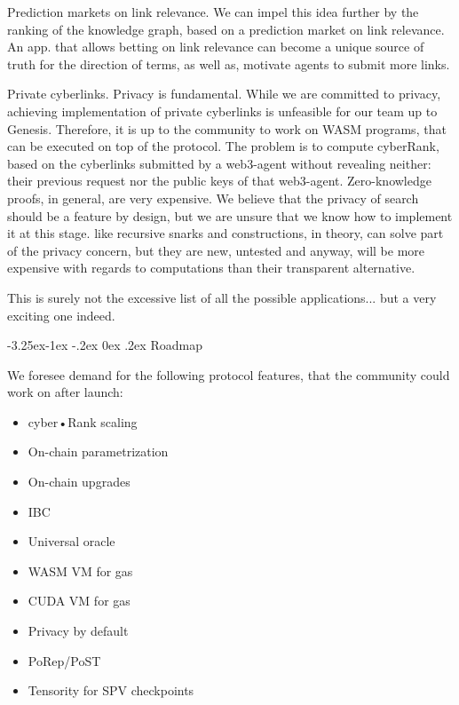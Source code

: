 \documentclass[8pt,oneside]{amsart}
\makeatletter
\newcommand{\linkgreen}[2]{\href{#1}{\color{green}{#2}}}
\renewcommand\subsection{\@startsection{subsection}{2}{\z@}%
                                     {-3.25ex\@plus -1ex \@minus -.2ex}%
                                     {0ex \@plus .2ex}%
                                     {\play\Large}}%
\newcommand{\titleSection}[1]{\subsection{#1}}
\newcommand{\code}[1]{{\PlayBold #1}}
\makeatother
\begin{document}
\begin{Abstract}
\code{Prediction markets on link relevance}. We can impel this idea further by the ranking of the knowledge graph, based on a prediction market on link relevance. An app. that allows betting on link relevance can become a unique source of truth for the direction of terms, as well as, motivate agents to submit more links.

\code{Private cyberlinks}. Privacy is fundamental. While we are committed to privacy, achieving implementation of private cyberlinks is unfeasible for our team up to Genesis. Therefore, it is up to the community to work on WASM programs, that can be executed on top of the protocol. The problem is to compute cyberRank, based on the cyberlinks submitted by a web3-agent without revealing neither: their previous request nor the public keys of that web3-agent. Zero-knowledge proofs, in general, are very expensive. We believe that the privacy of search should be a feature by design, but we are unsure that we know how to implement it at this stage. \linkgreen{https://ipfs.io/ipfs/Qmdje3AmtsfjX9edWAxo3LFhV9CTAXoUvwGR7wHJXnc2Gk}{Coda} like recursive snarks and \linkgreen{https://ipfs.io/ipfs/Qmd99xmraYip9cVv8gRMy6Y97Bkij8qUYArGDME7CzFasg}{MimbleWimble} constructions, in theory, can solve part of the privacy concern, but they are new, untested and anyway, will be more expensive with regards to computations than their transparent alternative.

This is surely not the excessive list of all the possible applications... but a very exciting one indeed.

\titleSection{Roadmap}\label{Roadmap}

We foresee demand for the following protocol features, that the community could work on after launch:

\begin{itemize}
\item cyber•Rank scaling
\item On-chain parametrization
\item On-chain upgrades
\item IBC
\item Universal oracle
\item WASM VM for gas
\item CUDA VM for gas
\item Privacy by default
\item PoRep/PoST
\item Tensority for SPV checkpoints

\end{itemize}


\end{Abstract}
\end{document}
